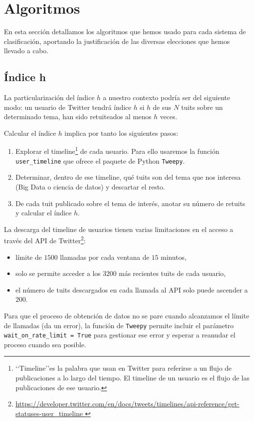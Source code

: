 \section{Algoritmos}
En esta sección detallamos los algoritmos que hemos usado para cada sistema de
clasificación, aportando la justificación de las diversas elecciones que 
hemos llevado a cabo.
\subsection{Índice h}
\label{subsect:indice_h}
La particularización del índice $h$ a nuestro contexto podría ser 
del siguiente modo: un usuario de Twitter tendrá índice $h$ si $h$ de sus $N$ tuits
sobre un determinado tema, han sido retuiteados al menos $h$ veces.

Calcular el índice $h$ implica por tanto los siguientes pasos:
\begin{enumerate}
\item Explorar el timeline\footnote{\lq\lq Timeline\rq\rq es la palabra
que usan en Twitter para referirse a un flujo de publicaciones a lo largo del tiempo.
El timeline de un usuario es el flujo de las publicaciones de ese usuario.} 
de cada usuario. Para ello usaremos la función
{\tt user\_timeline} que ofrece el paquete de Python {\tt Tweepy}. 
\item Determinar, dentro de ese timeline, qué tuits son del tema que nos interesa
(Big Data o ciencia de datos) y descartar el resto.
\item De cada tuit publicado sobre el tema de interés, anotar su número de 
retuits y calcular el índice $h$. 
\end{enumerate}

La descarga del timeline de usuarios tienen varias limitaciones en el acceso a través 
del API de Twitter\footnote{\url{https://developer.twitter.com/en/docs/tweets/timelines/api-reference/get-statuses-user_timeline }}:
\begin{itemize} 
\item límite de $1500$ llamadas por cada ventana de $15$ minutos,
\item solo se permite acceder a los $3200$ más recientes tuits de cada usuario,
\item el número de tuits descargados en cada llamada al API solo puede ascender a $200$.
\end{itemize}
Para que el proceso de obtención de datos no se pare cuando alcanzamos el límite
de llamadas (da un error), la función de {\tt Tweepy} permite incluir el parámetro 
{\tt wait\_on\_rate\_limit = True} para gestionar ese error y esperar a reanudar
el proceso cuando sea posible.

